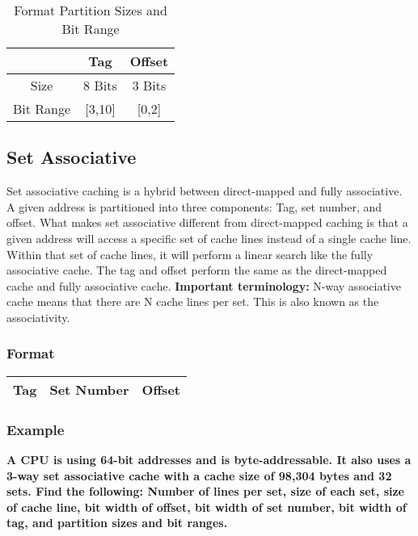 \documentclass[11pt]{article}
\begin{document}
\begin{table}[H]
	\centering
	\caption*{Format Partition Sizes and Bit Range}
	\begin{tabular}{| c | c | c |}
		\hline
		&	Tag		&	Offset\\
		\hline
		Size		&	8 Bits		&	3 Bits\\
		\hline
		Bit Range	&	[3,10]	&	[0,2]\\
		\hline
	\end{tabular}
\end{table}

\subsection{Set Associative}

Set associative caching is a hybrid between direct-mapped and fully associative. A given address is partitioned into three components: Tag, set number, and offset. What makes set associative different from direct-mapped caching is that a given address will access a specific set of cache lines instead of a single cache line. Within that set of cache lines, it will perform a linear search like the fully associative cache. The tag and offset perform the same as the direct-mapped cache and fully associative cache. \textbf{Important terminology:} N-way associative cache means that there are N cache lines per set. This is also known as the associativity.

\subsubsection{Format}

\begin{table}[H]
	\centering
	\begin{tabular}{| c | c | c|}
		\hline
		Tag			&		Set Number	&	 Offset\\
		\hline
	\end{tabular}
\end{table}

\subsubsection{Example}

\textbf{A CPU is using 64-bit addresses and is byte-addressable. It also uses a 3-way set associative cache with a cache size of 98,304 bytes and 32 sets. Find the following: Number of lines per set, size of each set, size of cache line, bit width of offset, bit width of set number, bit width of tag, and partition sizes and bit ranges.}
\end{document}
